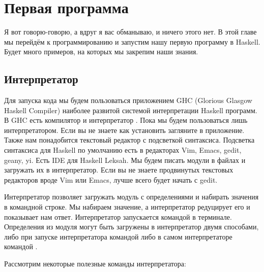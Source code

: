 \setcounter{chapter}{1}
\chapter{Первая программа}

Я вот говорю-говорю, а вдруг я вас обманываю, и ничего
этого нет. В этой главе мы перейдём к программированию и запустим
нашу первую программу в Haskell. Будет много примеров,
на которых мы закрепим наши знания.

\section{Интерпретатор}

 Для запуска кода мы будем пользоваться приложением GHC 
(Glorious Glasgow Haskell Compiler) наиболее  развитой
системой интерпретации Haskell программ. В GHC есть
компилятор  и интерпретатор . Пока
мы будем пользоваться лишь интерпретатором. Если 
вы не знаете как установить  загляните в приложение.
Также нам понадобится текстовый редактор с подсветкой синтаксиса. 
Подсветка синтаксиса для Haskell по умолчанию есть 
в редакторах Vim, Emacs, gedit, geany, yi. Есть IDE для Haskell Leksah.
Мы будем писать модули в файлах и загружать их в интерпретатор.
Если вы не знаете продвинутых текстовых редакторов вроде Vim или
Emacs, лучше всего будет начать с gedit.

Интерпретатор позволяет загружать модуль с определениями и 
набирать значения в командной строке. Мы набираем значение,
а интерпретатор редуцирует его и показывает нам ответ.
Интерпретатор запускается командой  в терминале.
Определения из модуля могут быть загружены в интерпретатор
двумя способами, либо при запуске интерпретатора командой
 либо в самом интерпретаторе командой 
.

Рассмотрим некоторые полезные команды интерпретатора:





